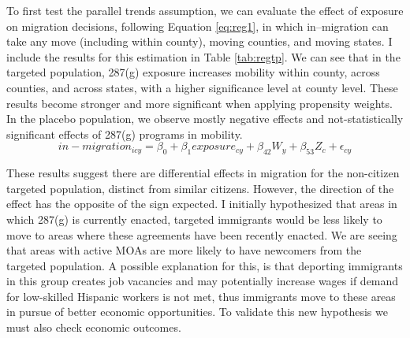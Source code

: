 \documentclass{article}
\begin{document}
To first test the parallel trends assumption, we can evaluate the effect of exposure on migration decisions, following Equation \ref{eq:reg1}, in which in--migration can take any move (including within county), moving counties, and moving states. I include the results for this estimation in Table \ref{tab:regtp}. We can see that in the targeted population, 287(g) exposure increases mobility within county, across counties, and across states, with a higher significance level at county level. These results become stronger and more significant when applying propensity weights. In the placebo population, we observe mostly negative effects and not-statistically significant effects of 287(g) programs in mobility.
\begin{equation}
    \label{eq:reg1}
    in-migration_{icy} = \beta_{0} + \beta_{1}exposure_{cy} +  \beta_{42}W_{y} + \beta_{53}Z_{c} + \epsilon_{cy} 
\end{equation}

These results suggest there are differential effects in migration for the non-citizen targeted population, distinct from similar citizens. However, the direction of the effect has the opposite of the sign expected. I initially hypothesized that areas in which 287(g) is currently enacted, targeted immigrants would be less likely to move to areas where these agreements have been recently enacted. We are seeing that areas with active MOAs are more likely to have newcomers from the targeted population. A possible explanation for this, is that deporting immigrants in this group creates job vacancies and may potentially increase wages if demand for low-skilled Hispanic workers is not met, thus immigrants move to these areas in pursue of better economic opportunities. To validate this new hypothesis we must also check economic outcomes.

\end{document}
